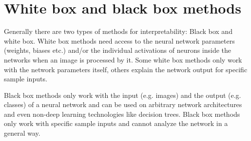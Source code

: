 \section{White box and black box methods}
Generally there are two types of methods for interpretability: Black box and white box. White box methods need access to the neural network parameters (weights, biases etc.) and/or the individual activations of neurons inside the networks when an image is processed by it. Some white box methods only work with the network parameters itself, others explain the network output for specific sample inputs.

Black box methods only work with the input (e.g. images) and the output (e.g. classes) of a neural network and can be used on arbitrary network architectures and even non-deep learning technologies like decision trees. Black box methods only work with specific sample inputs and cannot analyze the network in a general way.
